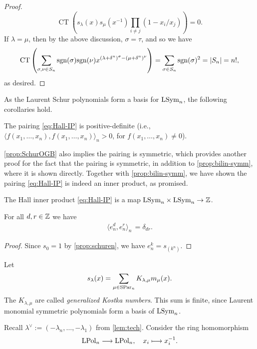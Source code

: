 \documentclass[11pt]{amsart}
\begin{document}
\begin{proof}
    \[
     \operatorname{CT}\left(s_{\lambda}(x)s_{\mu}(x^{-1})\prod_{i\neq j}(1 -  x_i/x_j)\right) = 0.
    \]
    If \(\lambda = \mu \), then by the above discussion, $\sigma = \tau$, and so we have
    \begin{align}
        \operatorname{CT}\left(\sum_{\sigma,\nu \in S_n} \mathrm{sgn}(\sigma)\mathrm{sgn}( \nu)x^{(\lambda + \delta^n)^\sigma - (\mu + \delta^n)^\nu} \right) = \sum_{\sigma \in S_n} \mathrm{sgn}(\sigma)^2 = |S_n| = n!,
    \end{align}
    as desired.
     \end{proof}
As the Laurent Schur polynomials form a basis for $\mathrm{LSym}_n$, the following corollaries hold.
\begin{cor}
    The pairing \cref{eq:Hall-IP} is positive-definite (i.e., $\langle f(x_1, \dots, x_n), f(x_1, \dots, x_n) \rangle_n > 0$, for \(f(x_1,\dots,x_n) \neq 0\)).
\end{cor}

\begin{rem}
     \cref{prop:SchurOGB} also implies the pairing is symmetric, which provides another proof for the fact that the pairing is symmetric, in addition to \cref{prop:bilin-symm}, where it is shown directly. Together with \cref{prop:bilin-symm}, we have shown the pairing \cref{eq:Hall-IP} is indeed an inner product, as promised.
\end{rem}

\begin{cor}
    The Hall inner product \cref{eq:Hall-IP} is a map \(\mathrm{LSym}_n \times \mathrm{LSym}_n \to \mathbb{Z}\). 
\end{cor}

\begin{cor}
    For all \(d,r \in \mathbb{Z}\) we have 
    \begin{align}
        \langle e_{n}^d, e_{n}^r\rangle_n \, = \delta_{dr}.
    \end{align} 
\end{cor}
\begin{proof}
    Since \(s_{0} = 1\) by \cref{prop:schuren}, we have \(e_n^k = s_{(k^n)}\).
\end{proof}

\begin{defin}
    Let
\begin{align}
    s_\lambda(x) = \sum_{\mu \in \mathrm{SPar}_n} K_{\lambda,\mu} m_\mu (x).
\end{align}
The $K_{\lambda,\mu}$ are called \emph{generalized Kostka numbers}.
This sum is finite, since Laurent monomial symmetric polynomials form a basis of $\mathrm{LSym}_n$.

\end{defin}
Recall $\lambda^\vee := (-\lambda_{n},\dots,-\lambda_{1})$ from \cref{lem:tech}.
Consider the ring homomorphism
\begin{align}
    \mathrm{LPol}_n \longrightarrow \mathrm{LPol}_n, \quad x_i\longmapsto x_i ^{-1}.\label{eq:gamma}
\end{align}
\end{document}
